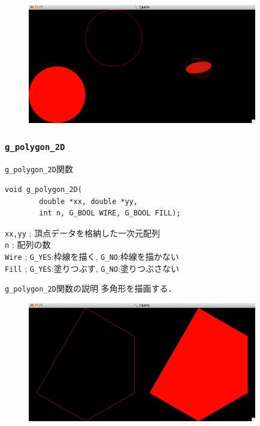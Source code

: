 \documentclass[platex,a4paper,12pt]{jsarticle}%
\begin{document}
\begin{figure}[htb]
\centering
	\includegraphics[width=100mm]{Canvas_g_circle2.eps}
\end{figure}




\clearpage
\subsubsection{\texttt{g\_polygon\_2D}}

\begin{itembox}[l]{\texttt{g\_polygon\_2D}関数}
\begin{verbatim}
void g_polygon_2D(
        double *xx, double *yy,
        int n, G_BOOL WIRE, G_BOOL FILL);
\end{verbatim}
\verb|xx,yy| ; 頂点データを格納した一次元配列\\
\verb|n| ; 配列の数\\
\verb|Wire| ; \verb|G_YES|:枠線を描く, \verb|G_NO|:枠線を描かない \\
\verb|Fill| ; \verb|G_YES|:塗りつぶす, \verb|G_NO|:塗りつぶさない 
\end{itembox}

\begin{itembox}[l]{\texttt{g\_polygon\_2D}関数の説明}
多角形を描画する．
\end{itembox}

\begin{figure}[htb]
\centering
	\includegraphics[width=100mm]{Canvas_g_polygon.eps}
\end{figure}
\end{document}
